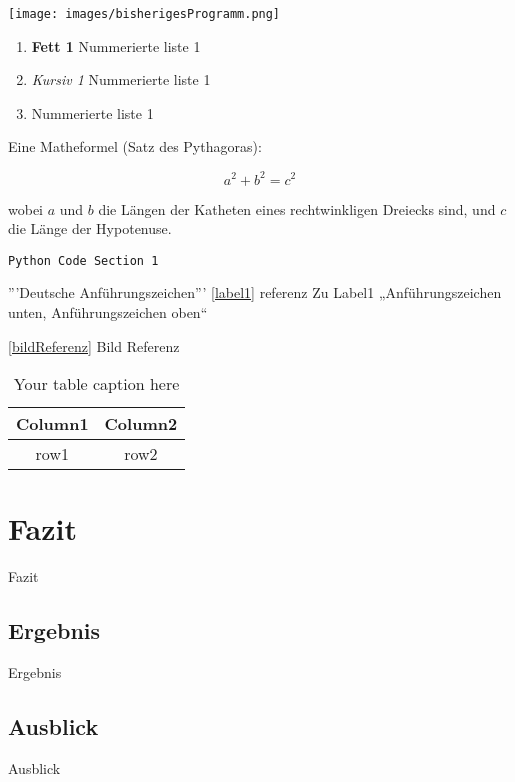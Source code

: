 

\begin{center}%
    \texttt{[image: images/bisherigesProgramm.png]}
    \label{bildReferenz}
\end{center}




\begin{enumerate}
    \item \textbf{Fett 1} Nummerierte liste 1
    \item \textit{Kursiv 1} Nummerierte liste 1
    \item Nummerierte liste 1
\end{enumerate}


Eine Matheformel (Satz des Pythagoras):

\[
a^2 + b^2 = c^2
\]

wobei \(a\) und \(b\) die Längen der Katheten eines rechtwinkligen Dreiecks sind, und \(c\) die Länge der Hypotenuse.



\begin{lstlisting}[caption={Pip Update}, label={lst:upgradePip}]
    Python Code Section 1
\end{lstlisting}


'''Deutsche Anführungszeichen''' \ref{label1} referenz Zu Label1 
„Anführungszeichen unten, Anführungszeichen oben“

\ref{bildReferenz} Bild Referenz

\begin{table}[h]
    \centering
    \begin{tabular}{|c|c|}
    \hline
        \textbf{Column1} & \textbf{Column2} \\ \hline
        row1 & row2 \\ \hline
    \end{tabular}
    \caption{Your table caption here}
    \label{table:1}
\end{table}

\newpage
\section{Fazit}
Fazit
\subsection{Ergebnis}
Ergebnis

\subsection{Ausblick}
Ausblick

\newpage
